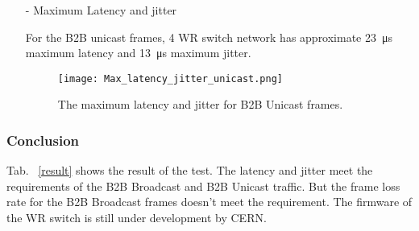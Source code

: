 \begin{itemize}
\begin{itemize}
For the B2B Unicast frames, 4 WR switch network has approximate \SI{11}{\us} average latency and \SI{0}{\us} average jitter. 

\begin{figure}[H]
   \centering   
   \texttt{[image: Avg\_latency\_jitter\_unicast.png]}
   \caption{The average latency and jitter for B2B Unicast frames.}
   \label{Avg_latency_jitter_unicast}
\end{figure}

			\item[-] Maximum Latency and jitter

For the B2B unicast frames, 4 WR switch network has approximate \SI{23}{\us} maximum latency and \SI{13}{\us} maximum jitter.

\begin{figure}[H]
   \centering   
   \texttt{[image: Max\_latency\_jitter\_unicast.png]}
   \caption{The maximum latency and jitter for B2B Unicast frames.}
   \label{Max_latency_jitter_unicast}
\end{figure}

		\end{itemize}
\end{itemize}



\subsubsection{Conclusion}

Tab. ~\ref{result} shows the result of the test. The latency and jitter meet the requirements of the B2B Broadcast and B2B Unicast traffic. But the frame loss rate for the B2B Broadcast frames doesn't meet the requirement. The firmware of the WR switch is still under development by CERN.

